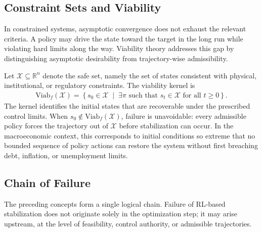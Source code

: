 \documentclass[11pt]{article}
\begin{document}
\subsection{Constraint Sets and Viability}
In constrained systems, asymptotic convergence does not exhaust the relevant criteria. A policy may drive the state toward the target in the long run while violating hard limits along the way. Viability theory addresses this gap by distinguishing asymptotic desirability from trajectory-wise admissibility.

Let $\mathcal{X} \subseteq \mathbb{R}^n$ denote the safe set, namely the set of states consistent with physical, institutional, or regulatory constraints. The viability kernel is
\begin{align}
    \mathrm{Viab}_f(\mathcal{X}) = \left\{ s_0 \in \mathcal{X} \;\middle|\; \exists \pi \text{ such that } s_t \in \mathcal{X} \text{ for all } t \ge 0 \right\}.
\end{align}
The kernel identifies the initial states that are recoverable under the prescribed control limits. When $s_0 \notin \mathrm{Viab}_f(\mathcal{X})$, failure is unavoidable: every admissible policy forces the trajectory out of $\mathcal{X}$ before stabilization can occur. In the macroeconomic context, this corresponds to initial conditions so extreme that no bounded sequence of policy actions can restore the system without first breaching debt, inflation, or unemployment limits.

\subsection{Chain of Failure}
The preceding concepts form a single logical chain. Failure of RL-based stabilization does not originate solely in the optimization step; it may arise upstream, at the level of feasibility, control authority, or admissible trajectories.
\end{document}
